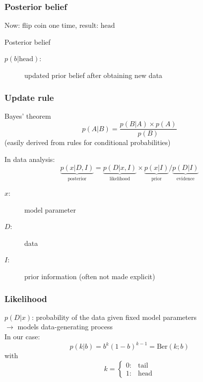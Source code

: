 \documentclass[t,aspectratio=169]{beamer}
\begin{document}
\begin{frame}
  \frametitle{Posterior belief}
  Now: flip coin one time, result: $\mathrm{head}$
  \begin{block}{Posterior belief}
    \begin{description}
      \item[$p(b|\mathrm{head})$:] updated prior belief after obtaining new data
    \end{description}
  \end{block}
  \vfill
  \centering
\end{frame}


\begin{frame}
  \frametitle{Update rule}
  \begin{block}{Bayes' theorem}
    \begin{equation*}
      p(A|B) = \frac{p(B|A) \times p(A)}{p(B)}
    \end{equation*}
    (easily derived from rules for conditional probabilities)
  \end{block}
  In data analysis:
  \begin{equation*}
    \underbrace{p(x|D,I)}_{\mathrm{posterior}} = \underbrace{p(D|x,I)}_{\mathrm{likelihood}} \times \underbrace{p(x|I)}_{\mathrm{prior}} / \underbrace{p(D|I)}_{\mathrm{evidence}}
  \end{equation*}
  \begin{description}
  \item[$x$:] model parameter
  \item[$D$:] data
  \item[$I$:] prior information (often not made explicit)
  \end{description}
\end{frame}


\begin{frame}
  \frametitle{Likelihood}
  $p(D|x)$: probability of the data given fixed model parameters\\
  $\rightarrow$ models data-generating process\\
  \bigbreak
  In our case:
  \begin{equation*}
    p(k|b) = b^k(1-b)^{k-1} = \mathrm{Ber}(k;b)
  \end{equation*}
  with
  \begin{equation*}
    k = \begin{cases} 0:& \mathrm{tail}\\
      1:& \mathrm{head}
    \end{cases}
  \end{equation*}
  \vfill
  \centering
\end{frame}
\end{document}
